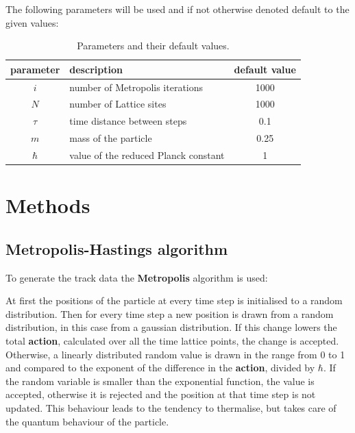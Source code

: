 \documentclass{scrartcl}
\begin{document}
		The following parameters will be used and if not otherwise denoted default to the given values:
		\begin{table}[H]
			\centering
			\begin{tabular}{c|l|c}
				parameter & description & default value\\
				\hline
				$i$ & number of Metropolis iterations & 1000\\
				$N$ & number of Lattice sites & 1000\\
				$\tau$ & time distance between steps & 0.1\\
				$m$ & mass of the particle & 0.25\\
				$\hbar$ & value of the reduced Planck constant & 1\\
			\end{tabular}
			\caption{Parameters and their default values.}
			\label{eq:parameters}
		\end{table}

	\section{Methods}
	\subsection{Metropolis-Hastings algorithm}
		To generate the track data the \textbf{Metropolis} algorithm is used:

		At first the positions of the particle at every time step is initialised to a random distribution.
		Then for every time step a new position is drawn from a random distribution, in this case from a gaussian distribution.
		If this change lowers the total \textbf{action}, calculated over all the time lattice points, the change is accepted.
		Otherwise, a linearly distributed random value is drawn in the range from 0 to 1 and compared to the exponent of the difference in the \textbf{action}, divided by $\hbar$.
		If the random variable is smaller than the exponential function, the value is accepted, otherwise it is rejected and the position at that time step is not updated.
		This behaviour leads to the tendency to thermalise, but takes care of the quantum behaviour of the particle.
\end{document}
